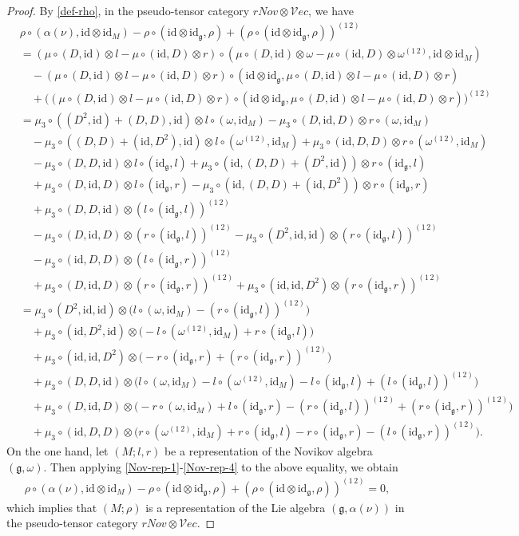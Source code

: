 \documentclass[12pt]{amsart}
\theoremstyle{definition}
\newcommand{\g}{\mathfrak g}
\newcommand{\id}{\mathrm{id}}
\newcommand{\ot}{\otimes}
\newcommand{\cc}{\circ}
\begin{document}
\begin{proof}
 By \eqref{def-rho}, in the pseudo-tensor category $rNov\ot\mathcal{V}ec$, we have
	\begin{align*}
	&\rho\cc(\alpha(\nu),\id\ot\id_M)-\rho\cc(\id\ot\id_\g, \rho)+(\rho\cc(\id\ot\id_\g,\rho))^{(1\,2)}\\
	&=(\mu\cc(D,\id)\ot l-\mu\cc(\id,D)\ot r)\cc(\mu\cc(D,\id)\ot \omega-\mu\cc(\id, D)\ot\omega^{(1\,2)},\id\ot\id_M)\\
	&\quad-(\mu\cc(D,\id)\ot l-\mu\cc(\id,D)\ot r)\cc(\id\ot\id_\g,\mu\cc(D,\id)\ot l-\mu\cc(\id,D)\ot r)\\
	&\quad+\bigl((\mu\cc(D,\id)\ot l-\mu\cc(\id,D)\ot r)\cc(\id\ot\id_\g,\mu\cc(D,\id)\ot l-\mu\cc(\id,D)\ot r)\bigr)^{(1\,2)}\\
	&=\mu_3\cc((D^2,\id)+(D,D),\id)\ot l\cc(\omega,\id_M)-\mu_3\cc(D,\id,D)\ot r\cc(\omega,\id_M)\\
	&\quad-\mu_3\cc((D,D)+(\id,D^2),\id)\ot l\cc(\omega^{(1\,2)},\id_M)+\mu_3\cc(\id,D,D)\ot r\cc(\omega^{(1\,2)},\id_M)\\
	&\quad-\mu_3\cc(D,D,\id)\ot l\cc(\id_\g,l)+\mu_3\cc(\id,(D,D)+(D^2,\id))\ot r\cc(\id_\g,l)\\
	&\quad+\mu_3\cc(D,\id,D)\ot l\cc(\id_\g,r)-\mu_3\cc(\id,(D,D)+(\id,D^2))\ot r\cc(\id_\g,r) \\
	&\quad+\mu_3\cc(D,D,\id)\ot (l\cc(\id_\g,l))^{(1\,2)}\\
	&\quad-\mu_3\cc(D,\id,D)\ot (r\cc(\id_\g,l))^{(1\,2)}-\mu_3\cc(D^2,\id,\id)\ot (r\cc(\id_\g,l))^{(1\,2)}\\
	&\quad-\mu_3\cc(\id,D,D)\ot (l\cc(\id_\g,r))^{(1\,2)}\\
	&\quad+\mu_3\cc(D,\id,D)\ot (r\cc(\id_\g,r))^{(1\,2)}+\mu_3\cc(\id,\id,D^2)\ot (r\cc(\id_\g,r))^{(1\,2)}\\
	&=\mu_3\cc(D^2,\id,\id)\ot\bigl(l\cc(\omega,\id_M)-(r\cc(\id_\g,l))^{(1\,2)}\bigr)\\
	&\quad+\mu_3\cc(\id,D^2,\id)\ot\bigl(-l\cc(\omega^{(1\,2)},\id_M)+ r\cc(\id_\g,l)\bigr)\\
	&\quad+\mu_3\cc(\id,\id,D^2)\ot\bigl(-r\cc(\id_\g,r)+(r\cc(\id_\g,r))^{(1\,2)}\bigr)\\
	&\quad+\mu_3\cc(D,D,\id)\ot\bigl(l\cc(\omega,\id_M)-l\cc(\omega^{(1\,2)},\id_M)-l\cc(\id_\g,l)+(l\cc(\id_\g,l))^{(1\,2)}\bigr)\\
	&\quad+\mu_3\cc(D,\id,D)\ot\bigl(-r\cc(\omega,\id_M)+l\cc(\id_\g,r)-(r\cc(\id_\g,l))^{(1\,2)}+(r\cc(\id_\g,r))^{(1\,2)}\bigr)\\
	&\quad+\mu_3\cc(\id,D,D)\ot \bigl(r\cc(\omega^{(1\,2)},\id_M)+r\cc(\id_\g,l)-r\cc(\id_\g,r)-(l\cc(\id_\g,r))^{(1\,2)}\bigr).
\end{align*}
On the one hand, let $(M;l,r)$ be a representation of the Novikov algebra $(\g,\omega)$. Then applying \eqref{Nov-rep-1}-\eqref{Nov-rep-4} to the above equality, we obtain
\begin{align}
\rho\cc(\alpha(\nu),\id\ot\id_M)-\rho\cc(\id\ot\id_\g, \rho)+(\rho\cc(\id\ot\id_\g,\rho))^{(1\,2)}=0,\label{e1}
\end{align}
which implies that $(M;\rho)$ is a representation of the Lie algebra $(\g,\alpha(\nu))$ in the pseudo-tensor category $rNov\ot\mathcal{V}ec$.


\end{proof}
\end{document}
